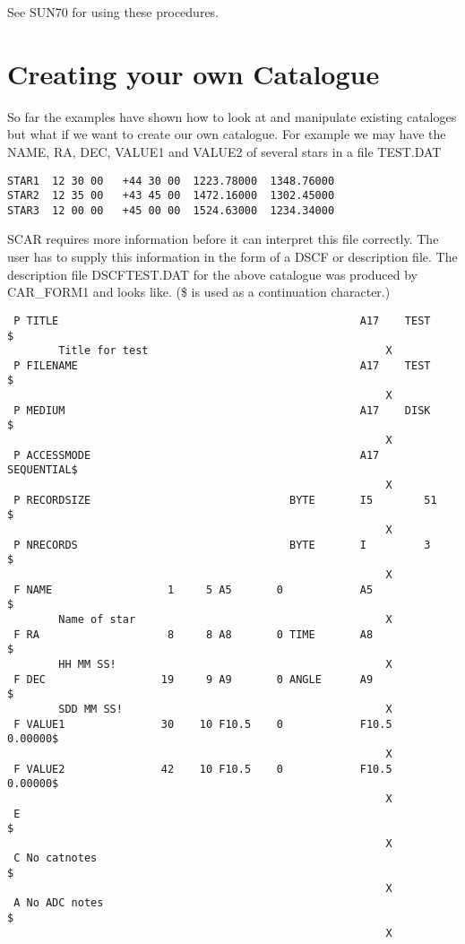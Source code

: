 See SUN70 for using these procedures.

\section{Creating your own Catalogue}

So far the examples have shown how to look at and manipulate existing cataloges
but what if we want to create our own catalogue. For example we may have the
NAME, RA, DEC, VALUE1 and VALUE2 of several stars in a file TEST.DAT

\begin{verbatim}
STAR1  12 30 00   +44 30 00  1223.78000  1348.76000
STAR2  12 35 00   +43 45 00  1472.16000  1302.45000
STAR3  12 00 00   +45 00 00  1524.63000  1234.34000
\end{verbatim}

SCAR requires more information before it can interpret this file correctly.
The user has to supply this information in the form of a DSCF or description
file. The description file DSCFTEST.DAT for the above catalogue was produced
by CAR\_FORM1 and looks like. (\$ is used as a continuation character.)


\begin{verbatim}
 P TITLE                                               A17    TEST      $
        Title for test                                     X
 P FILENAME                                            A17    TEST      $
                                                           X
 P MEDIUM                                              A17    DISK      $
                                                           X
 P ACCESSMODE                                          A17    SEQUENTIAL$
                                                           X
 P RECORDSIZE                               BYTE       I5        51     $
                                                           X
 P NRECORDS                                 BYTE       I         3      $
                                                           X
 F NAME                  1     5 A5       0            A5               $
        Name of star                                       X
 F RA                    8     8 A8       0 TIME       A8               $
        HH MM SS!                                          X
 F DEC                  19     9 A9       0 ANGLE      A9               $
        SDD MM SS!                                         X
 F VALUE1               30    10 F10.5    0            F10.5     0.00000$
                                                           X
 F VALUE2               42    10 F10.5    0            F10.5     0.00000$
                                                           X
 E                                                                      $
                                                           X
 C No catnotes                                                          $
                                                           X
 A No ADC notes                                                         $
                                                           X
\end{verbatim}

